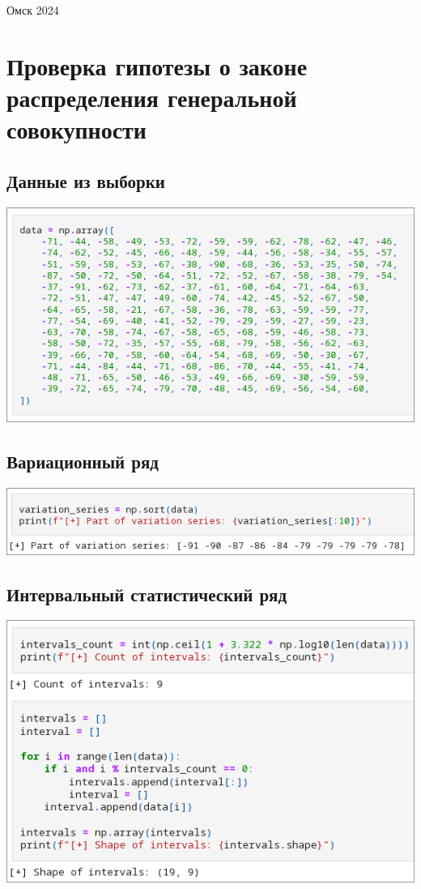 \documentclass[a4paper]{article}
\begin{document}
    \vspace*{\fill}
    \begin{center}
        Омск 2024
    \end{center}

    \newpage

    \section*{Проверка гипотезы о законе распределения генеральной совокупности}

    \subsection*{Данные из выборки}
    \includegraphics[width=\textwidth]{images/data.png}

    \subsection*{Вариационный ряд}
    \includegraphics[width=\textwidth]{images/variation_series.png}

    \subsection*{Интервальный статистический ряд}
    \includegraphics[width=\textwidth]{images/interval_series.png}
\end{document}
